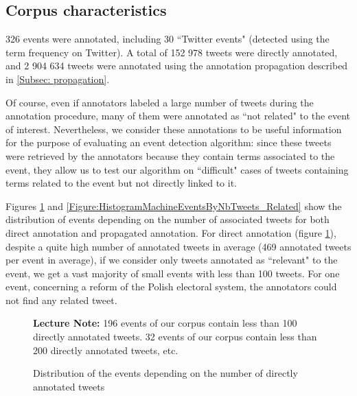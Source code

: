 	\subsection{Corpus characteristics}
	326 events were annotated, including 30 ``Twitter events" (detected using the term frequency on Twitter). A total of 152 978 tweets were directly annotated, and 2 904 634 tweets were annotated using the annotation propagation described in \ref{Subsec: propagation}. 


Of course, even if annotators labeled a large number of tweets during the annotation procedure, many of them were annotated as ``not related" to the event of interest. Nevertheless, we consider these annotations to be useful information for the purpose of evaluating an event detection algorithm: since these tweets were retrieved by the annotators because they contain terms associated to the event, they allow us to test our algorithm on ``difficult" cases of tweets containing terms related to the event but not directly linked to it. 


Figures \ref{Figure:HistogramEventsByNbTweets_Related} and \ref{Figure:HistogramMachineEventsByNbTweets_Related} show the distribution of events depending on the number of associated tweets for both direct annotation and propagated annotation.  For direct annotation (figure \ref{Figure:HistogramEventsByNbTweets_Related}), despite a quite high number of annotated tweets in average (469 annotated tweets per event in average), if we consider only tweets annotated as ``relevant" to the event, we get a vast majority of small events with less than 100 tweets. For one event, concerning a reform of the Polish electoral system,  the annotators could not find any related tweet. 


\begin{figure}
\begin{center}

\end{center}
{\scriptsize 

\textbf{Lecture Note:} 196 events of our corpus contain less than 100 directly annotated tweets. 32 events of our corpus contain less than 200 directly annotated tweets, etc.
}
\caption{Distribution of the events depending on the number of directly annotated tweets}
\label{Figure:HistogramEventsByNbTweets_Related}
\end{figure}

